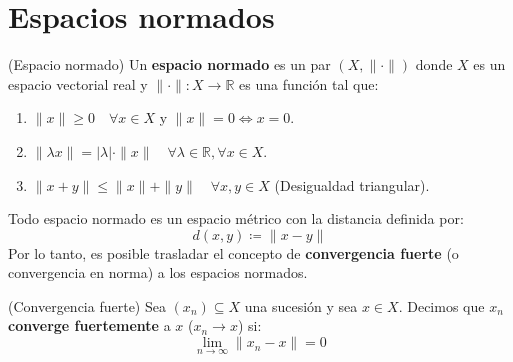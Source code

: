 \documentclass[12pt]{book}
\newcommand{\tbf}{\textbf}
\newcommand{\R}{\mathbb{R}}
\begin{document}


\chapter{Espacios normados}

\begin{definicion}(Espacio normado)
    Un \tbf{espacio normado} es un par $(X, \|\cdot\|)$ donde $X$ es un espacio vectorial real y $\|\cdot\| : X \longrightarrow \R$ es una función tal que:
    \begin{enumerate}
        \item [1)] $\|x\| \geq 0 \quad \forall x \in X$ y $\|x\| = 0 \iff x = 0$.
        \item [2)] $\|\lambda x\| = |\lambda| \cdot \|x\| \quad \forall \lambda \in \R, \forall x \in X$.
        \item [3)] $\|x + y\| \leq \|x\| + \|y\| \quad \forall x, y \in X$ (Desigualdad triangular).
    \end{enumerate}
\end{definicion}


\begin{observacion}
    Todo espacio normado es un espacio métrico con la distancia definida por:
    \begin{equation*}
        d(x,y) \coloneqq \|x - y\|
    \end{equation*}
    Por lo tanto, es posible trasladar el concepto de \tbf{convergencia fuerte} (o convergencia en norma) a los espacios normados.
\end{observacion}

\begin{definicion}(Convergencia fuerte)
    Sea $(x_n) \subseteq X$ una sucesión y sea $x \in X$. Decimos que $x_n$ \tbf{converge fuertemente} a $x$ ($x_n \to x$) si:
    \begin{equation*}
        \lim_{n \to \infty} \|x_n - x\| = 0
    \end{equation*}
\end{definicion}
\end{document}
